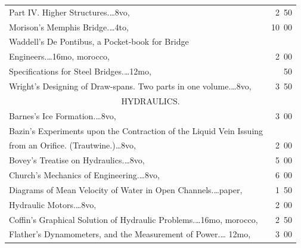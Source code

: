\documentclass[a4paper,12pt]{book}[2004/02/16]
\theoremstyle{ilemma}
\theoremstyle{itheorem}
\theoremstyle{iother}
\theoremstyle{icorollary}
\theoremstyle{numcorollary}
\theoremstyle{idefinition}
\begin{document}
\begin{longtable}{@{}l@{ }r@{}}
\indent Part IV\@. Higher Structures.\dotfill\ldots 8vo, &2\
50\\
Morison's Memphis Bridge.\dotfill\ldots 4to, &10\ 00\\

Waddell's De Pontibus, a Pocket-book for Bridge\\

\nopagebreak

\indent\indent Engineers.\dotfill\ldots 16mo, morocco, &2\ 00\\

\nopagebreak

\indent * Specifications for Steel Bridges.\dotfill\ldots 12mo, &\ 50\\

Wright's Designing of Draw-spans. Two parts in one
volume.\dotfill\ldots 8vo, &3\ 50\\[2em]



\multicolumn{2}{c}{HYDRAULICS.}\\[1em]

\nopagebreak

Barnes's Ice Formation.\dotfill\ldots 8vo, &3\ 00\\

Bazin's Experiments upon the Contraction of the Liquid Vein Issuing\\

\nopagebreak

\indent\indent from an Orifice. (Trautwine.)\dotfill\ldots 8vo, &2\ 00\\

Bovey's Treatise on Hydraulics.\dotfill\ldots 8vo, &5\ 00\\

Church's Mechanics of Engineering.\dotfill\ldots 8vo, &6\ 00\\

\nopagebreak

\indent Diagrams of Mean Velocity of Water in Open
Channels.\dotfill\ldots paper, &1\ 50\\

\nopagebreak

\indent Hydraulic Motors.\dotfill\ldots 8vo, &2\ 00\\

Coffin's Graphical Solution of Hydraulic Problems.\dotfill\ldots 16mo,
morocco, &2\ 50\\

Flather's Dynamometers, and the Measurement of Power.\dotfill\ldots
12mo, &3\ 00\\


\end{longtable}
\end{document}
